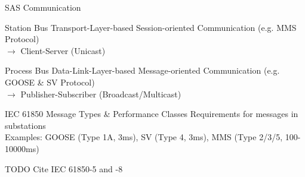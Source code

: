 \documentclass[en]{sdqbeamer}
\begin{document}
\begin{frame}{SAS Communication}
    \begin{blueblock}{Station Bus}
        Transport-Layer-based Session-oriented Communication (e.g. MMS Protocol)
        \\$\rightarrow$ Client-Server (Unicast)
    \end{blueblock}
    \begin{blueblock}{Process Bus}
        Data-Link-Layer-based Message-oriented Communication (e.g. GOOSE \& SV Protocol)
        \\$\rightarrow$ Publisher-Subscriber (Broadcast/Multicast)
    \end{blueblock}
    \begin{grayblock}{IEC 61850 Message Types \& Performance Classes}
        Requirements for messages in substations
        \\Examples: GOOSE (Type 1A, 3ms), SV (Type 4, 3ms), MMS (Type 2/3/5, 100-10000ms)
    \end{grayblock}
    TODO Cite IEC 61850-5 and -8
\end{frame}
\end{document}
